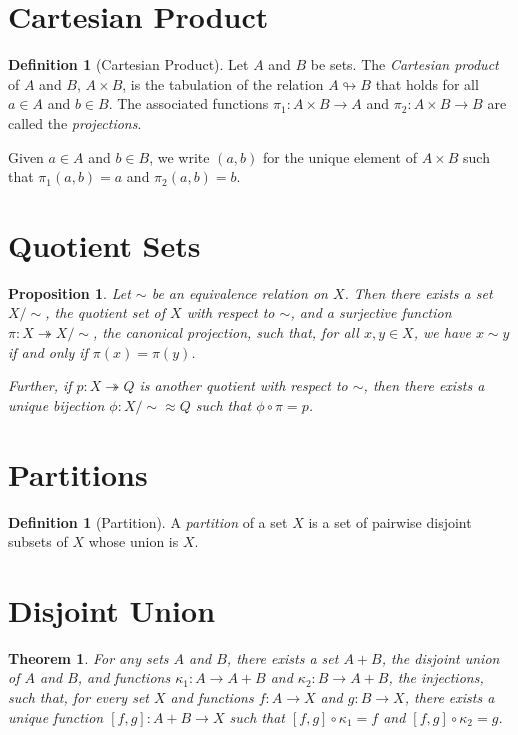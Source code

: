 \documentclass{book}
\newtheorem{prop}[ax]{Proposition}
\newtheorem{thm}[ax]{Theorem}
\theoremstyle{definition}
\newtheorem{df}[ax]{Definition}
\begin{document}
\section{Cartesian Product}

\begin{df}[Cartesian Product]
Let $A$ and $B$ be sets. The \emph{Cartesian product} of $A$ and $B$, $A \times B$, is the tabulation of the relation $A \looparrowright B$ that holds for all $a \in A$ and $b \in B$. The associated functions $\pi_1 : A \times B \rightarrow A$ and $\pi_2 : A \times B \rightarrow B$ are called the \emph{projections}.

Given $a \in A$ and $b \in B$, we write $(a,b)$ for the unique element of $A \times B$ such that $\pi_1(a,b) = a$ and $\pi_2(a,b) = b$.
\end{df}

\section{Quotient Sets}

\begin{prop}
Let $\sim$ be an equivalence relation on $X$. Then there exists a set $X/\sim$, the \emph{quotient set} of $X$ with respect to $\sim$, and a surjective function $\pi : X \twoheadrightarrow X / \sim$, the \emph{canonical projection}, such that, for all $x,y \in X$, we have $x \sim y$ if and only if $\pi(x) = \pi(y)$.

Further, if $p : X \twoheadrightarrow Q$ is another quotient with respect to $\sim$, then there exists a unique bijection $\phi : X / \sim \approx Q$ such that $\phi \circ \pi = p$.
\end{prop}

\section{Partitions}

\begin{df}[Partition]
A \emph{partition} of a set $X$ is a set of pairwise disjoint subsets of $X$ whose union is $X$.
\end{df}

\section{Disjoint Union}

\begin{thm}
For any sets $A$ and $B$, there exists a set $A + B$, the \emph{disjoint union} of $A$ and $B$, and functions $\kappa_1 : A \rightarrow A + B$ and $\kappa_2 : B \rightarrow A + B$, the \emph{injections}, such that, for every set $X$ and functions $f : A \rightarrow X$ and $g : B \rightarrow X$, there exists a unique function $[f,g] : A + B \rightarrow X$ such that $[f,g] \circ \kappa_1 = f$ and $[f,g] \circ \kappa_2 = g$.
\end{thm}
\end{document}
